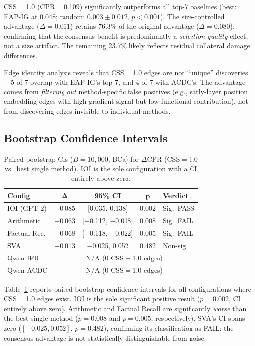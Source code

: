 \documentclass[11pt,a4paper]{article}
\newcommand{\cpr}{\textsc{CPR}}
\newcommand{\eapig}{\textsc{EAP-IG}}
\begin{document}
CSS$=$1.0 (\cpr{}$=$0.109) significantly outperforms all top-7 baselines (best: \eapig{} at 0.048; random: $0.003 \pm 0.012$, $p < 0.001$). The size-controlled advantage ($\Delta = 0.061$) retains 76.3\% of the original advantage ($\Delta = 0.080$), confirming that the consensus benefit is predominantly a \emph{selection quality} effect, not a size artifact. The remaining 23.7\% likely reflects residual collateral damage differences.

Edge identity analysis reveals that CSS$=$1.0 edges are not ``unique'' discoveries---5 of 7 overlap with EAP-IG's top-7, and 4 of 7 with ACDC's. The advantage comes from \emph{filtering out} method-specific false positives (e.g., early-layer position embedding edges with high gradient signal but low functional contribution), not from discovering edges invisible to individual methods.

\subsection{Bootstrap Confidence Intervals}
\label{sec:bootstrap}

\begin{table}[t]
\centering
\small
\begin{tabular}{lcccl}
\toprule
\textbf{Config} & $\boldsymbol{\Delta}$ & \textbf{95\% CI} & $\boldsymbol{p}$ & \textbf{Verdict} \\
\midrule
IOI (GPT-2) & +0.085 & [0.035, 0.138] & 0.002 & Sig.\ PASS \\
Arithmetic  & $-$0.063 & [$-$0.112, $-$0.018] & 0.008 & Sig.\ FAIL \\
Factual Rec.& $-$0.068 & [$-$0.118, $-$0.022] & 0.005 & Sig.\ FAIL \\
SVA         & +0.013 & [$-$0.025, 0.052] & 0.482 & Non-sig. \\
Qwen IFR    & \multicolumn{4}{c}{N/A (0 CSS$=$1.0 edges)} \\
Qwen ACDC   & \multicolumn{4}{c}{N/A (0 CSS$=$1.0 edges)} \\
\bottomrule
\end{tabular}
\caption{Paired bootstrap CIs ($B{=}10{,}000$, BCa) for $\Delta$\cpr{} (CSS$=$1.0 vs.\ best single method). IOI is the sole configuration with a CI entirely above zero.}
\label{tab:bootstrap}
\end{table}

Table~\ref{tab:bootstrap} reports paired bootstrap confidence intervals for all configurations where CSS$=$1.0 edges exist. IOI is the sole significant positive result ($p=0.002$, CI entirely above zero). Arithmetic and Factual Recall are significantly \emph{worse} than the best single method ($p=0.008$ and $p=0.005$, respectively). SVA's CI spans zero ($[-0.025, 0.052]$, $p=0.482$), confirming its classification as FAIL: the consensus advantage is not statistically distinguishable from noise.
\end{document}
